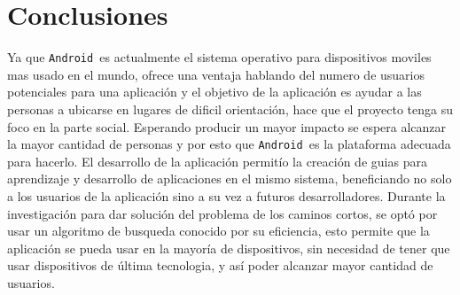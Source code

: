 \documentclass[journal]{IEEEtran}
\newcommand{\andr}{\texttt{Android~}}
\begin{document}
\section{Conclusiones}
Ya que \andr es actualmente el sistema operativo para dispositivos moviles mas usado en el mundo, ofrece una ventaja hablando del numero de usuarios potenciales para una aplicación y el objetivo de la aplicación es ayudar a las personas a ubicarse en lugares de dificil orientación, hace que el proyecto tenga su foco en la parte social. Esperando producir un mayor impacto se espera alcanzar la mayor cantidad de personas y por esto que \andr es la plataforma adecuada para hacerlo.
El desarrollo de la aplicación permitío la creación de guias para aprendizaje y desarrollo de aplicaciones en el mismo sistema, beneficiando no solo a los usuarios de la aplicación sino a su vez a futuros desarrolladores. Durante la investigación para dar solución del problema de los caminos cortos, se optó por usar un algoritmo de busqueda conocido por su eficiencia, esto permite que la aplicación se pueda usar en la mayoría de dispositivos, sin necesidad de tener que usar dispositivos de última tecnologia, y así poder alcanzar mayor cantidad de usuarios.
\end{document}
